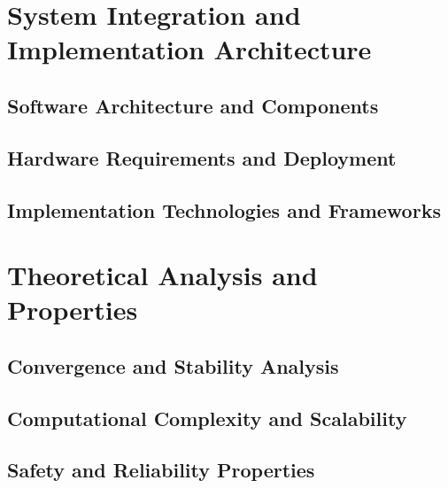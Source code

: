 \section{System Integration and Implementation Architecture}

\subsection{Software Architecture and Components}

\subsection{Hardware Requirements and Deployment}

\subsection{Implementation Technologies and Frameworks}

\section{Theoretical Analysis and Properties}

\subsection{Convergence and Stability Analysis}

\subsection{Computational Complexity and Scalability}

\subsection{Safety and Reliability Properties}

